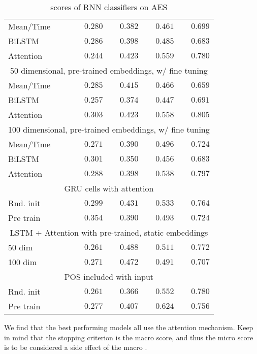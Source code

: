 \begin{table}
\begin{tabular}{lrrrr}
    Mean/Time & $0.280$ & $0.382$ & $0.461$ & $0.699$ \\
    BiLSTM & $0.286$ & $0.398$ & $0.485$ & $0.683$ \\
    Attention & $0.244$ & $0.423$ & $0.559$ & $0.780$ \\
    \midrule
    \multicolumn{5}{c}{50 dimensional, pre-trained embeddings, w/ fine tuning} \\
    \midrule
    Mean/Time & $0.285$ & $0.415$ & $0.466$ & $0.659$ \\
    BiLSTM & $0.257$ & $0.374$ & $0.447$ & $0.691$ \\
    Attention & $0.303$ & $0.423$ & $0.558$ & $\mathbf{0.805}$ \\
    \midrule
    \multicolumn{5}{c}{100 dimensional, pre-trained embeddings, w/ fine tuning} \\
    \midrule
    Mean/Time & $0.271$ & $0.390$ & $0.496$ & $0.724$ \\
    BiLSTM & $0.301$ & $0.350$ & $0.456$ & $0.683$ \\
    Attention & $0.288$ & $0.398$ & $0.538$ & $0.797$ \\
    \midrule
    \multicolumn{5}{c}{GRU cells with attention} \\
    \midrule
    Rnd. init & $0.299$ & $0.431$ & $0.533$ & $0.764$ \\
    Pre train & $\mathbf{0.354}$ & $0.390$ & $0.493$ & $0.724$ \\
    \midrule
    \multicolumn{5}{c}{LSTM + Attention with pre-trained, static embeddings} \\
    \midrule
    50 dim & $0.261$ & $\mathbf{0.488}$ & $0.511$ & $0.772$ \\
    100 dim & $0.271$ & $0.472$ & $0.491$ & $0.707$ \\
    \midrule
    \multicolumn{5}{c}{POS included with input} \\
    \midrule
    Rnd. init & $0.261$ & $0.366$ & $0.552$ & $0.780$ \\
    Pre train & $0.277$ & $0.407$ & $\mathbf{0.624}$ & $0.756$ \\
    \bottomrule
  \end{tabular}
  \caption{\FI scores of RNN classifiers on AES}
  \label{tab:rnn-results}
\end{table}

We find that the best performing models all use the attention mechanism.
Keep in mind that the stopping criterion is the macro \FI score, and thus
the micro \FI score is to be considered a side effect of the macro \FI.



